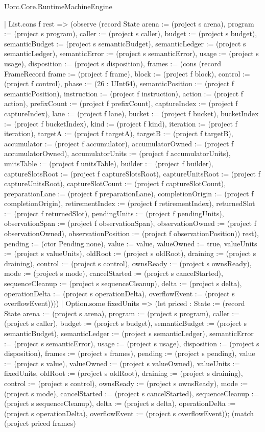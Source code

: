 \begin{lexlean}{Uorc.Core.RuntimeMachineEngine}
\begin{semanticmodule}
{      | List.cons f rest => (observe (record State {arena := (project s arena), program := (project s program), caller := (project s caller), budget := (project s budget), semanticBudget := (project s semanticBudget), semanticLedger := (project s semanticLedger), semanticError := (project s semanticError), usage := (project s usage), disposition := (project s disposition), frames := (cons (record FrameRecord {frame := (project f frame), block := (project f block), control := (project f control), phase := (26 : UInt64), semanticPosition := (project f semanticPosition), instruction := (project f instruction), action := (project f action), prefixCount := (project f prefixCount), captureIndex := (project f captureIndex), lane := (project f lane), bucket := (project f bucket), bucketIndex := (project f bucketIndex), kind := (project f kind), iteration := (project f iteration), targetA := (project f targetA), targetB := (project f targetB), accumulator := (project f accumulator), accumulatorOwned := (project f accumulatorOwned), accumulatorUnits := (project f accumulatorUnits), unitsTable := (project f unitsTable), builder := (project f builder), captureSlotsRoot := (project f captureSlotsRoot), captureUnitsRoot := (project f captureUnitsRoot), captureSlotCount := (project f captureSlotCount), preparationLane := (project f preparationLane), completionOrigin := (project f completionOrigin), retirementIndex := (project f retirementIndex), returnedSlot := (project f returnedSlot), pendingUnits := (project f pendingUnits), observationSpan := (project f observationSpan), observationOwned := (project f observationOwned), observationPosition := (project f observationPosition)}) rest), pending := (ctor Pending.none), value := value, valueOwned := true, valueUnits := (project s valueUnits), oldRoot := (project s oldRoot), draining := (project s draining), control := (project s control), ownsReady := (project s ownsReady), mode := (project s mode), cancelStarted := (project s cancelStarted), sequenceCleanup := (project s sequenceCleanup), delta := (project s delta), operationDelta := (project s operationDelta), overflowEvent := (project s overflowEvent)})))
    | Option.some fixedUnits => (let priced : State := (record State {arena := (project s arena), program := (project s program), caller := (project s caller), budget := (project s budget), semanticBudget := (project s semanticBudget), semanticLedger := (project s semanticLedger), semanticError := (project s semanticError), usage := (project s usage), disposition := (project s disposition), frames := (project s frames), pending := (project s pending), value := (project s value), valueOwned := (project s valueOwned), valueUnits := fixedUnits, oldRoot := (project s oldRoot), draining := (project s draining), control := (project s control), ownsReady := (project s ownsReady), mode := (project s mode), cancelStarted := (project s cancelStarted), sequenceCleanup := (project s sequenceCleanup), delta := (project s delta), operationDelta := (project s operationDelta), overflowEvent := (project s overflowEvent)}); (match (project priced frames)
}
\end{semanticmodule}
\end{lexlean}
